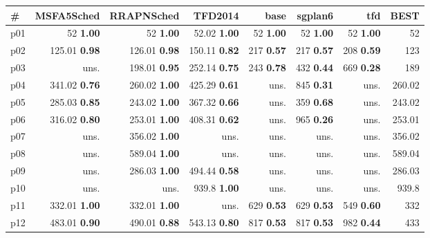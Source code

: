 \begin{tabular}{|l|rrrrrr|r|}
\hline
\textbf{\#} & \textbf{MSFA5Sched} & \textbf{RRAPNSched} & \textbf{TFD2014} & \textbf{base} & \textbf{sgplan6} & \textbf{tfd} & \textbf{BEST}\\
\hline
p01 & {\footnotesize 52} \textbf{1.00} & {\footnotesize 52} \textbf{1.00} & {\footnotesize 52.02} \textbf{1.00} & {\footnotesize 52} \textbf{1.00} & {\footnotesize 52} \textbf{1.00} & {\footnotesize 52} \textbf{1.00} & 52\\
p02 & {\footnotesize 125.01} \textbf{0.98} & {\footnotesize 126.01} \textbf{0.98} & {\footnotesize 150.11} \textbf{0.82} & {\footnotesize 217} \textbf{0.57} & {\footnotesize 217} \textbf{0.57} & {\footnotesize 208} \textbf{0.59} & 123\\
p03 & uns. & {\footnotesize 198.01} \textbf{0.95} & {\footnotesize 252.14} \textbf{0.75} & {\footnotesize 243} \textbf{0.78} & {\footnotesize 432} \textbf{0.44} & {\footnotesize 669} \textbf{0.28} & 189\\
p04 & {\footnotesize 341.02} \textbf{0.76} & {\footnotesize 260.02} \textbf{1.00} & {\footnotesize 425.29} \textbf{0.61} & uns. & {\footnotesize 845} \textbf{0.31} & uns. & 260.02\\
p05 & {\footnotesize 285.03} \textbf{0.85} & {\footnotesize 243.02} \textbf{1.00} & {\footnotesize 367.32} \textbf{0.66} & uns. & {\footnotesize 359} \textbf{0.68} & uns. & 243.02\\
p06 & {\footnotesize 316.02} \textbf{0.80} & {\footnotesize 253.01} \textbf{1.00} & {\footnotesize 408.31} \textbf{0.62} & uns. & {\footnotesize 965} \textbf{0.26} & uns. & 253.01\\
p07 & uns. & {\footnotesize 356.02} \textbf{1.00} & uns. & uns. & uns. & uns. & 356.02\\
p08 & uns. & {\footnotesize 589.04} \textbf{1.00} & uns. & uns. & uns. & uns. & 589.04\\
p09 & uns. & {\footnotesize 286.03} \textbf{1.00} & {\footnotesize 494.44} \textbf{0.58} & uns. & uns. & uns. & 286.03\\
p10 & uns. & uns. & {\footnotesize 939.8} \textbf{1.00} & uns. & uns. & uns. & 939.8\\
p11 & {\footnotesize 332.01} \textbf{1.00} & {\footnotesize 332.01} \textbf{1.00} & uns. & {\footnotesize 629} \textbf{0.53} & {\footnotesize 629} \textbf{0.53} & {\footnotesize 549} \textbf{0.60} & 332\\
p12 & {\footnotesize 483.01} \textbf{0.90} & {\footnotesize 490.01} \textbf{0.88} & {\footnotesize 543.13} \textbf{0.80} & {\footnotesize 817} \textbf{0.53} & {\footnotesize 817} \textbf{0.53} & {\footnotesize 982} \textbf{0.44} & 433\\

\end{tabular}
